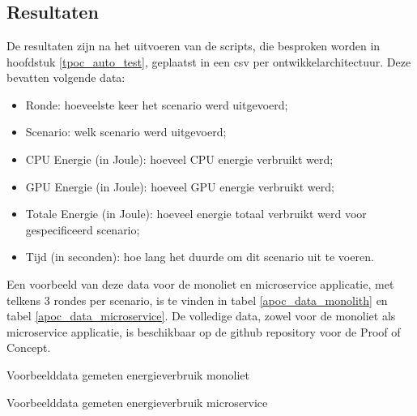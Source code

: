 

\chapter{}
\label{ch:analyse-test-poc}

\section{Resultaten}
De resultaten zijn na het uitvoeren van de scripts, die besproken worden in hoofdstuk \ref{tpoc_auto_test}, geplaatst in een csv per ontwikkelarchitectuur. Deze bevatten volgende data: 
\begin{itemize}
    \item Ronde: hoeveelste keer het scenario werd uitgevoerd;
    \item Scenario: welk scenario werd uitgevoerd;
    \item CPU Energie (in Joule): hoeveel CPU energie verbruikt werd;
    \item GPU Energie (in Joule): hoeveel GPU energie verbruikt werd;
    \item Totale Energie (in Joule): hoeveel energie totaal verbruikt werd voor gespecificeerd scenario;
    \item Tijd (in seconden): hoe lang het duurde om dit scenario uit te voeren.
\end{itemize}
Een voorbeeld van deze data voor de monoliet en microservice applicatie, met telkens 3 rondes per scenario, is te vinden in tabel \ref{apoc_data_monolith} en tabel \ref{apoc_data_microservice}. De volledige data, zowel voor de monoliet als microservice applicatie, is beschikbaar op de github repository voor de Proof of Concept.

\begin{table}[h!]
\caption{Voorbeelddata gemeten energieverbruik monoliet}
\label{apoc_data_monolith}
\end{table}

\begin{table}[h!]
    \caption{Voorbeelddata gemeten energieverbruik microservice}
    \label{apoc_data_microservice}
\end{table}

